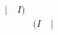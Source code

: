 \documentclass[preview]{standalone}
\begin{document}
\begin{align*}
\quad \big| \quad I ) \\ &(I \quad \big| \quad
\end{align*}
\end{document}
